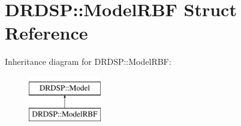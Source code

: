 \hypertarget{struct_d_r_d_s_p_1_1_model_r_b_f}{\section{D\-R\-D\-S\-P\-:\-:Model\-R\-B\-F Struct Reference}
\label{struct_d_r_d_s_p_1_1_model_r_b_f}
}
Inheritance diagram for D\-R\-D\-S\-P\-:\-:Model\-R\-B\-F\-:\begin{figure}[H]
\begin{center}
\leavevmode
\includegraphics[height=2.000000cm]{struct_d_r_d_s_p_1_1_model_r_b_f}
\end{center}
\end{figure}
